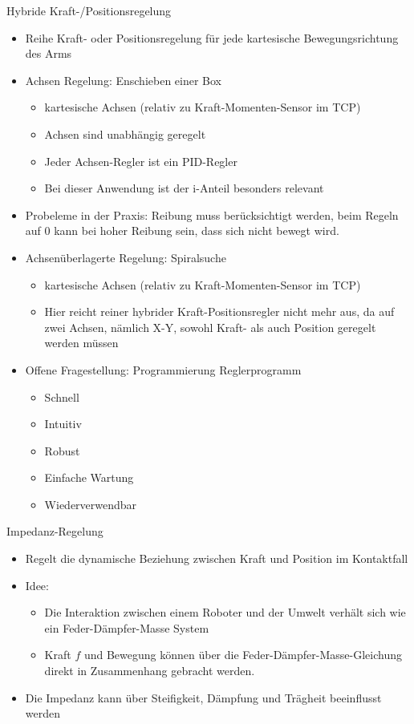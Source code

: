 \documentclass[paper=a4, fontsize=11pt]{scrartcl} %
\numberwithin{equation}{section} %
\numberwithin{figure}{section} %
\numberwithin{table}{section} %
\begin{document}
Hybride Kraft-/Positionsregelung
\begin{itemize}
\item Reihe Kraft- oder Positionsregelung für jede kartesische Bewegungsrichtung des Arms
\item Achsen Regelung: Enschieben einer Box
\begin{itemize}
\item kartesische Achsen (relativ zu Kraft-Momenten-Sensor im TCP)
\item Achsen sind unabhängig geregelt
\item Jeder Achsen-Regler ist ein PID-Regler
\item Bei dieser Anwendung ist der i-Anteil besonders relevant
\end{itemize}
\item Probeleme in der Praxis: Reibung muss berücksichtigt werden, beim Regeln auf 0 kann bei hoher Reibung sein, dass sich nicht bewegt wird.
\item Achsenüberlagerte Regelung: Spiralsuche
\begin{itemize}
\item kartesische Achsen (relativ zu Kraft-Momenten-Sensor im TCP)
\item Hier reicht reiner hybrider Kraft-Positionsregler nicht mehr aus, da auf zwei Achsen, nämlich X-Y, sowohl Kraft- als auch Position geregelt werden müssen
\end{itemize}
\item Offene Fragestellung: Programmierung Reglerprogramm
\begin{itemize}
\item Schnell
\item Intuitiv
\item Robust
\item Einfache Wartung
\item Wiederverwendbar
\end{itemize}
\end{itemize}

Impedanz-Regelung
\begin{itemize}
\item Regelt die dynamische Beziehung zwischen Kraft und Position im Kontaktfall
\item Idee:
\begin{itemize}
\item Die Interaktion zwischen einem Roboter und der Umwelt verhält sich wie ein Feder-Dämpfer-Masse System
\item Kraft $f$ und Bewegung können über die Feder-Dämpfer-Masse-Gleichung direkt in Zusammenhang gebracht werden.
\end{itemize}
\item Die Impedanz kann über Steifigkeit, Dämpfung und Trägheit beeinflusst werden
\end{itemize}
\end{document}
